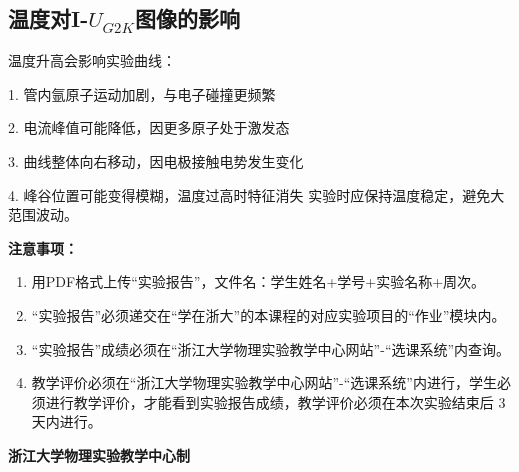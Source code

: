 \documentclass[10pt,a4paper]{ctexart}
\newcommand{\sihao}{\fontsize{14pt}{18pt}\selectfont}
\newcommand{\xiaosi}{\fontsize{12pt}{16pt}\selectfont}
\begin{document}
    \subsection{\texorpdfstring{温度对I-$U_{G2K}$图像的影响}{温度对I-UG2K图像的影响}}
温度升高会影响实验曲线：

1. 管内氩原子运动加剧，与电子碰撞更频繁

2. 电流峰值可能降低，因更多原子处于激发态

3. 曲线整体向右移动，因电极接触电势发生变化

4. 峰谷位置可能变得模糊，温度过高时特征消失
实验时应保持温度稳定，避免大范围波动。

\newpage

\sihao\textbf{注意事项：}
\xiaosi
\begin{enumerate}
    \item 用PDF格式上传“实验报告”，文件名：学生姓名+学号+实验名称+周次。
    \item  “实验报告”必须递交在“学在浙大”的本课程的对应实验项目的“作业”模块内。
    \item  “实验报告”成绩必须在“浙江大学物理实验教学中心网站”-“选课系统”内查询。
    \item 教学评价必须在“浙江大学物理实验教学中心网站”-“选课系统”内进行，学生必须进行教学评价，才能看到实验报告成绩，教学评价必须在本次实验结束后 3 天内进行。
\end{enumerate}

\vspace{1cm}
\xiaosi\centering \textbf{浙江大学物理实验教学中心制}
\end{document}
